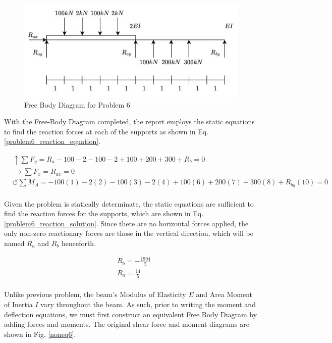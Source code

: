 \documentclass[a4paper]{article}
\begin{document}
\begin{figure}[h]
\includegraphics[width=\textwidth]{FBD/FBD_6.jpg}
\caption{Free Body Diagram for Problem 6}
\label{FBD_6}
\end{figure}

With the Free-Body Diagram completed, the report employs the static equations to find the reaction forces at each of the supports as shown in Eq. \ref{problem6_reaction_equation}.

\begin{equation}
\begin{split}
	&\uparrow \sum F_y = R_a - 100 - 2 - 100 -2 + 100 + 200 + 300 + R_b = 0 \\
 	&\rightarrow \sum F_x = R_{ax} = 0 \\
 	&\circlearrowleft \sum M_A = -100(1) - 2(2) -100(3) - 2(4) +100(6) + 200(7) + 300(8) + R_{by}(10) = 0 \\
\end{split}
\label{problem6_reaction_equation}
\end{equation}

Given the problem is statically determinate, the static equations are sufficient to find the reaction forces for the supports, which are shown in Eq. \ref{problem6_reaction_solution}. Since there are no horizontal forces applied, the only non-zero reactionary forces are those in the vertical direction, which will be named $R_a$ and $R_b$ henceforth.

\begin{equation}
\begin{split}
	& R_b = -\frac{1994}{5} \\
	& R_a = \frac{14}{5} \\
\end{split}
\label{problem6_reaction_solution}
\end{equation}

Unlike previous problem, the beam's Modulus of Elasticity $E$ and Area Moment of Inertia $I$ vary throughout the beam. As such, prior to writing the moment and deflection equations, we must first construct an equivalent Free Body Diagram by adding forces and moments. The original shear force and moment diagrams are shown in Fig. \ref{noneq6}.
\end{document}
